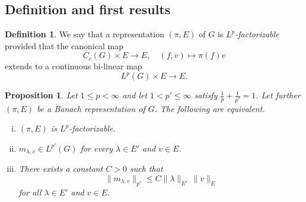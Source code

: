 \documentclass[12pt,letterpaper,titlepage,reqno]{amsart}
\theoremstyle{plain}
\newtheorem{prop}[theorem]{Proposition}
\theoremstyle{definition}
\newtheorem{definition}[theorem]{Definition}
\numberwithin{equation}{section}
\begin{document}
\subsection{Definition and first results}
\begin{definition}
We say that a representation $(\pi,E)$ of $G$ is {\em{${L^p}$-factorizable}} provided that the canonical map
$$
C_c(G)\times E\rightarrow E,\quad(f,v)\mapsto \pi(f)v
$$
extends to a continuous bi-linear map
$$
L^p(G)\times E \rightarrow E.
$$
\end{definition}

\begin{prop}\label{Prop Factorizability of Banach reps}
Let $1\le p<\infty$ and let $1<p'\le\infty$ satisfy $\frac1p+\frac1{p'}=1$.
Let further $(\pi,E)$ be a Banach representation of $G$.
The following are equivalent.
\begin{enumerate}[(i)]
\item\label{i} $(\pi,E)$ is $L^p$-factorizable.
\item\label{ii}  $m_{\lambda,v}\in L^{p'}(G)$ for every $\lambda\in E'$ and $v\in E$.
\item\label{iii}  There exists a constant $C>0$ such that
$$\|m_{\lambda,v}\|_{p'}\leq C\|\lambda\|_{E'}\,\|v\|_E$$
for all $\lambda\in E'$ and $v\in E$.
\end{enumerate}
\end{prop}
\end{document}
